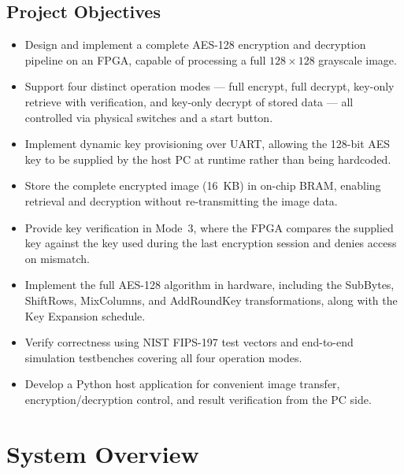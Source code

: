 \documentclass[12pt,a4paper]{article}
\begin{document}
\subsection{Project Objectives}
\begin{itemize}
    \item Design and implement a complete AES-128 encryption and decryption pipeline on an FPGA, capable of processing a full $128 \times 128$ grayscale image.
    
    \item Support four distinct operation modes — full encrypt, full decrypt, key-only retrieve with verification, and key-only decrypt of stored data — all controlled via physical switches and a start button.
    
    \item Implement dynamic key provisioning over UART, allowing the 128-bit AES key to be supplied by the host PC at runtime rather than being hardcoded.
    
    \item Store the complete encrypted image (16~KB) in on-chip BRAM, enabling retrieval and decryption without re-transmitting the image data.
    
    \item Provide key verification in Mode~3, where the FPGA compares the supplied key against the key used during the last encryption session and denies access on mismatch.
    
    \item Implement the full AES-128 algorithm in hardware, including the SubBytes, ShiftRows, MixColumns, and AddRoundKey transformations, along with the Key Expansion schedule.
    
    \item Verify correctness using NIST FIPS-197 test vectors and end-to-end simulation testbenches covering all four operation modes.
    
    \item Develop a Python host application for convenient image transfer, encryption/decryption control, and result verification from the PC side.
\end{itemize}


\section{System Overview}
\end{document}
